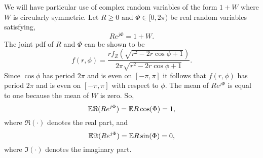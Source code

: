 \documentclass[journal]{IEEEtran}
\begin{document}
We will have particular use of complex random variables of the form $1 + W$ where $W$ is circularly symmetric.  Let $R \geq 0$ and $\Phi \in [0,2\pi)$ be real random variables satisfying, 
\[
R e^{j\Phi} = 1 + W.
\]
The joint pdf of $R$ and $\Phi$ can be shown to be
 \begin{equation}\label{eq:pdfRPhi}
 f(r,\phi) = \frac{r f_Z(\sqrt{r^2 - 2r\cos\phi + 1})}{2\pi\sqrt{r^2 - 2r\cos\phi + 1}}.
 \end{equation}
Since $\cos\phi$ has period $2\pi$ and is even on $[-\pi,\pi]$ it follows that $f(r,\phi)$ has period $2\pi$ and is even on $[-\pi,\pi]$ with respect to $\phi$.  The mean of $R e^{j\Phi}$ is equal to one because the mean of $W$ is zero.  So,
\[
{\mathbb E} \Re(R e^{j\Phi}) = {\mathbb E} R \cos(\Phi) = 1,
\]
where $\Re(\cdot)$ denotes the real part, and
\begin{equation}\label{eq:expectImpartRphi}
{\mathbb E} \Im(R e^{j\Phi}) = {\mathbb E} R \sin(\Phi) = 0,
\end{equation}
where $\Im(\cdot)$ denotes the imaginary part.


\end{document}

